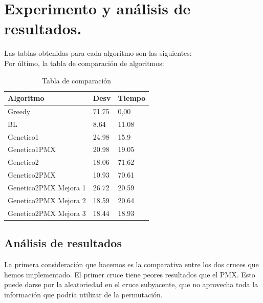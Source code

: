 \newpage
\section{Experimento y análisis de resultados.}

Las tablas obtenidas para cada algoritmo son las siguientes:\\




















\newpage
Por último, la tabla de comparación de algoritmos:

\begin{table}[htbp]
	\begin{center}
		\begin{tabular}{|l|l|l|}
			\hline
			Algoritmo &  Desv & Tiempo\\
			\hline \hline
			Greedy& 71.75 & 0,00\\ \hline
			BL& 8.64& 11.08\\ \hline
			Genetico1 & 24.98 & 15.9\\ \hline
			Genetico1PMX & 20.98& 19.05\\ \hline
			Genetico2 & 18.06 & 71.62\\ \hline
			Genetico2PMX & 10.93 & 70.61\\ \hline
			Genetico2PMX Mejora 1 & 26.72 & 20.59\\ \hline
			Genetico2PMX Mejora 2 & 18.59 & 20.64\\ \hline
			Genetico2PMX Mejora 3 & 18.44 & 18.93\\ \hline
		\end{tabular}
		\caption{Tabla de comparación}
		\label{tabla:TablaComparacion}
	\end{center}
\end{table}

\subsection{Análisis de resultados}

La primera consideración que hacemos es la comparativa entre los dos cruces que hemos implementado. El primer cruce tiene peores resultados que el PMX. Esto puede darse por la aleatoriedad en el cruce subyacente, que no aprovecha toda la información que podría utilizar de la permutación.\\

